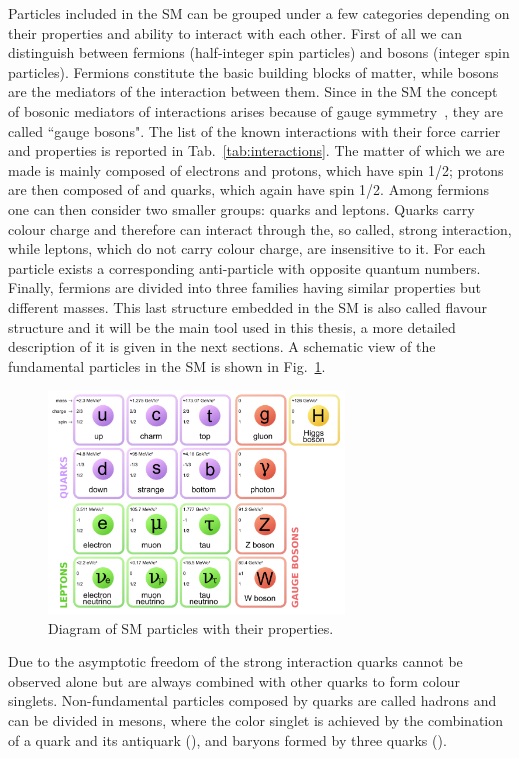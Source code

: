 Particles included in the SM can be grouped under a few categories depending on their properties and ability to interact with
each other. First of all we can distinguish between fermions (half-integer spin particles) and bosons (integer spin particles).
Fermions constitute the basic building blocks of matter, while bosons are the mediators of the interaction between them.
Since in the SM the concept of bosonic mediators of interactions arises because of gauge symmetry~\cite{Glashow:1961tr},
they are called ``gauge bosons". The list of the known interactions with their force carrier and properties is reported
in Tab.~\ref{tab:interactions}. The matter of which we are made is mainly composed of electrons and protons, which have spin 1/2;
protons are then composed of \uquark and \dquark quarks, which again have spin 1/2. Among fermions one can then consider two smaller
groups: quarks and leptons. Quarks carry colour charge and therefore can interact through the, so called, strong interaction,
while leptons, which do not carry colour charge, are insensitive to it.
For each particle exists a corresponding anti-particle with opposite quantum numbers.
Finally, fermions are divided into three families having similar properties but different masses.
This last structure embedded in the SM is also called flavour structure and it will be the main tool
used in this thesis, a more detailed description of it is given in the next sections.
A schematic view of the fundamental particles in the SM is shown in Fig.~\ref{fig:SMparticles}.
%
\begin{figure}[h]
\centering
\includegraphics[width=0.7\textwidth]{Introduction/figs/SM.png}
\caption{Diagram of SM particles with their properties.}
\label{fig:SMparticles}
\end{figure}
%
Due to the asymptotic freedom of the strong interaction quarks cannot be observed alone but
are always combined with other quarks to form colour singlets. Non-fundamental particles
composed by quarks are called hadrons and can be divided in mesons, where the color singlet
is achieved by the combination of a quark and its antiquark (\quark\quarkbar), and baryons
formed by three quarks (\quark\quark\quark). 


